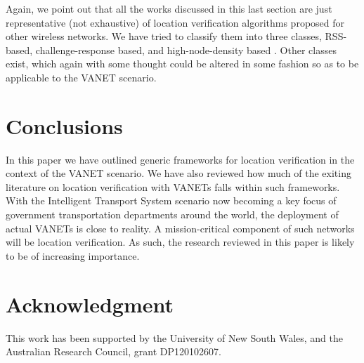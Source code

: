 \documentclass[journal]{IEEEtran}
\begin{document}
Again, we point out that all the works discussed in this last section are just representative (not exhaustive) of location verification algorithms proposed for other wireless networks. We have tried to classify them into three classes, RSS-based, challenge-response based, and high-node-density based . Other classes exist, which again with some thought could be altered in some fashion so as to be applicable to the VANET scenario.

\section{Conclusions} \label{Conclusions}

  In this paper we have outlined generic frameworks for location verification in the context of the VANET scenario. We have also reviewed how much of the exiting literature on location verification with VANETs falls within such frameworks. With the Intelligent Transport System scenario now becoming a key focus of government transportation departments around the world, the deployment of actual VANETs is close to reality. A mission-critical component of such networks will be location verification. As such, the  research reviewed in this paper is likely to be of increasing importance.



\section{Acknowledgment} \label{acknowledgment}

This work has been supported by the University of New
South Wales, and the Australian Research Council, grant DP120102607.
\end{document}
